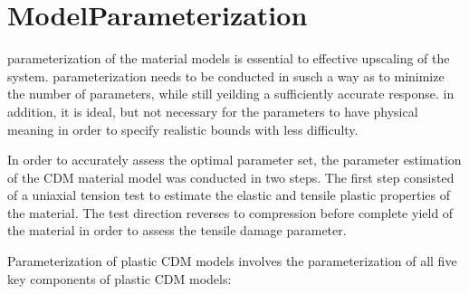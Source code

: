 \section{ModelParameterization}
parameterization of the material models is essential to effective upscaling of the system. parameterization needs to be conducted in susch a way as to minimize the number of parameters, while still yeilding a sufficiently accurate response. in addition, it is ideal, but not necessary for the parameters to have physical meaning in order to specify realistic bounds with less difficulty.

In order to accurately assess the optimal parameter set, the parameter estimation of the CDM material model was conducted in two steps. The first step consisted of a uniaxial tension test to estimate the elastic and tensile plastic properties of the material. The test direction reverses to compression before complete yield of the material in order to assess the tensile damage parameter. 

Parameterization of plastic CDM models involves the parameterization of all five key components of plastic CDM models: